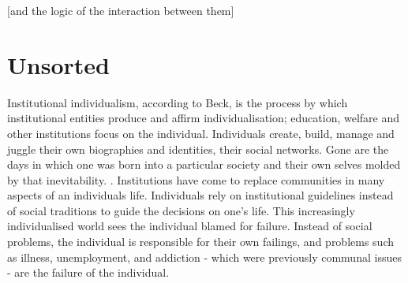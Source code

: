 [and the logic of the interaction between them]
	
\section{Unsorted}
Institutional individualism, according to Beck, is the process by which institutional entities produce and affirm individualisation; education, welfare and other institutions focus on the individual. Individuals create, build, manage and juggle their own biographies and identities, their social networks. Gone are the days in which one was born into a particular society and their own selves molded by that inevitability. \citep{Beck2001}. Institutions have come to replace communities in many aspects of an individuals life. Individuals rely on institutional guidelines instead of social traditions to guide the decisions on one's life. \citep{Beck2001} 
This increasingly individualised world sees the individual blamed for failure. Instead of social problems, the individual is responsible for their own failings, and problems such as illness, unemployment, and addiction - which were previously communal issues - are the failure of the individual. \citep{Beck2001} 

